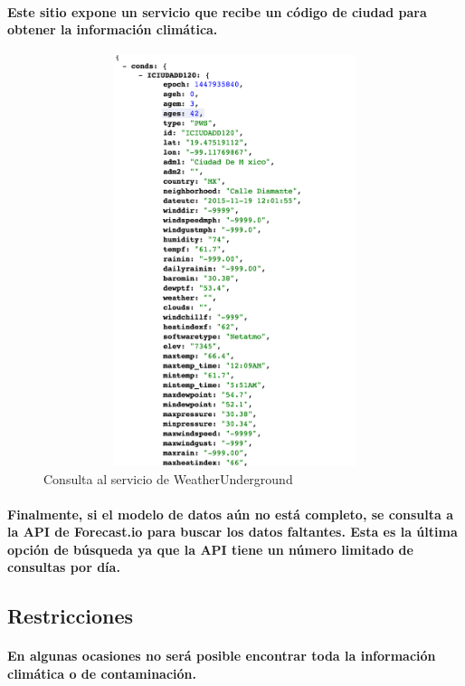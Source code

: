     \paragraph{Este sitio expone un servicio que recibe un código de ciudad para obtener la información climática.}
    \begin{figure}[b!]
      \begin{center}
        \includegraphics[width=12cm,height=12cm]{./images/WeatherUnderground}
        \caption{Consulta al servicio de WeatherUnderground}
      \end{center}
    \end{figure}
    \paragraph{Finalmente, si el modelo de datos aún no está completo, se consulta a la API de Forecast.io para buscar los datos faltantes. Esta es la última opción de búsqueda ya que la API tiene un número limitado de consultas por día.}
  \newpage
  
  \subsection{Restricciones}
    \paragraph{En algunas ocasiones no será posible encontrar toda la información climática o de contaminación.}
